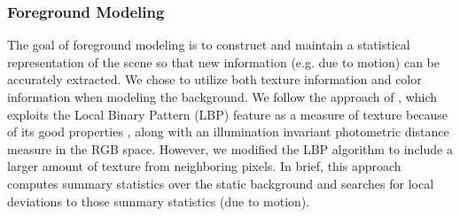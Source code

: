\documentclass[10pt,letterpaper]{article}
\begin{document}
\subsubsection{Foreground Modeling}

The goal of foreground modeling is to construct and maintain a statistical representation of the scene so that new information (e.g. due to motion) can be accurately extracted. We chose to utilize both texture information and color information when modeling the background. We follow the approach of , which exploits the Local Binary Pattern (LBP) feature as a measure of texture because of its good properties \cite{Halika}, along with an illumination invariant photometric distance measure in the RGB space. However, we modified the LBP algorithm to include a larger amount of texture from neighboring pixels. In brief, this approach computes summary statistics over the static background and searches for local deviations to those summary statistics (due to motion).

\end{document}
